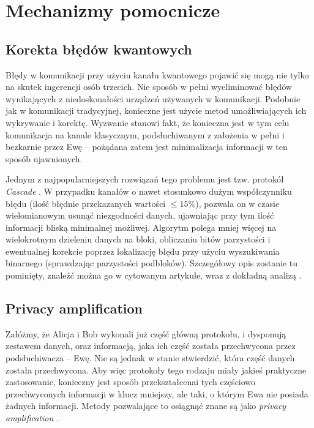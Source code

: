 \documentclass[10pt]{article}
\begin{document}
\section{Mechanizmy pomocnicze}

\subsection{Korekta błędów kwantowych}

Błędy w komunikacji przy użyciu kanału kwantowego pojawić się mogą nie tylko na skutek ingerencji
osób trzecich. Nie sposób w pełni wyeliminować błędów wynikających z niedoskonałości urządzeń
używanych w komunikacji. Podobnie jak w komunikacji tradycyjnej, konieczne jest użycie metod
umożliwiających ich wykrywanie i korektę. Wyzwanie stanowi fakt, że konieczna jest w tym celu
komunikacja na kanale klasycznym, podsłuchiwanym z założenia w pełni i bezkarnie przez Ewę -- 
pożądana zatem jest minimalizacja informacji w ten sposób ujawnionych.

Jednym z najpopularniejszych rozwiązań tego problemu jest tzw. protokół \emph{Cascade} \cite{Brassard94}.
W przypadku kanałów o nawet stosunkowo dużym współczynniku błędu (ilość błędnie przekazanych wartości
\(\leq 15\%\)), pozwala on w czasie wielomianowym usunąć niezgodności danych, ujawniając przy tym
ilość informacji bliską minimalnej możliwej. Algorytm polega mniej więcej na wielokrotnym dzieleniu 
danych na bloki, obliczaniu bitów parzystości i ewentualnej korekcie poprzez lokalizację błędu przy
użyciu wyszukiwania binarnego (sprawdzając parzystości podbloków). Szczegółowy opis zostanie tu
pominięty, znaleźć można go w cytowanym artykule, wraz z dokładną analizą \cite{Brassard94}.


\subsection{Privacy amplification}

Załóżmy, że Alicja i Bob wykonali już część główną protokołu, i dysponują zestawem danych, oraz
informacją, jaka ich część została przechwycona przez podsłuchiwacza -- Ewę. Nie są jednak w stanie
stwierdzić, która część danych została przechwycona. Aby więc protokoły tego rodzaju miały jakieś
praktyczne zastosowanie, konieczny jest sposób przekształcenai tych częściowo przechwyconych informacji
w klucz mniejszy, ale taki, o którym Ewa nie posiada żadnych informacji. Metody pozwalające to osiągnąć
znane są jako \emph{privacy amplification} \cite{Watanabe07}.
\end{document}
